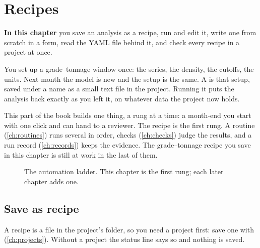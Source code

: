 \chapter{Recipes}\label{ch:recipes}
\begin{goals}
\textbf{In this chapter} you save an analysis as a recipe, run and edit it, write one from scratch in a form, read the YAML file behind it, and check every recipe in a project at once.
\end{goals}

You set up a grade–tonnage window once: the series, the density, the cutoffs, the units. Next month the model is new and the setup is the same. A  is that setup, saved under a name as a small text file in the project. Running it puts the analysis back exactly as you left it, on whatever data the project now holds.

This part of the book builds one thing, a rung at a time: a month-end you start with one click and can hand to a reviewer. The recipe is the first rung. A routine (\cref{ch:routines}) runs several in order, checks (\cref{ch:checks}) judge the results, and a run record (\cref{ch:records}) keeps the evidence. The grade–tonnage recipe you save in this chapter is still at work in the last of them.

\begin{figure}[htbp]\centering
{}
\caption{The automation ladder. This chapter is the first rung; each later chapter adds one.}\label{fig:recipes-ladder}
\end{figure}

\section{Save as recipe}\label{sec:recipes-save}
A recipe is a file in the project's  folder, so you need a project first: save one with  (\cref{ch:projects}). Without a project the status line says so and nothing is saved.


